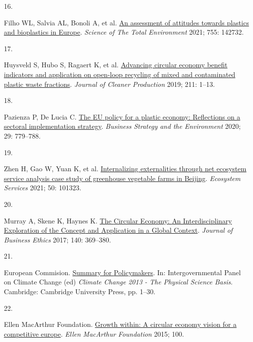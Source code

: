\documentclass[
  12pt,
  a4paperpaper,
  onecolumn]{article}
\newlength{\cslhangindent}
\newlength{\csllabelwidth}
\newlength{\cslentryspacingunit} %
\newenvironment{CSLReferences}[2] %
 {%
  \setlength{\parindent}{0pt}
  \ifodd #1
  \let\oldpar\par
  \def\par{\hangindent=\cslhangindent\oldpar}
  \fi
  \setlength{\parskip}{#2\cslentryspacingunit}
 }%
 {}
\newcommand{\CSLLeftMargin}[1]{\parbox[t]{\csllabelwidth}{#1}}
\newcommand{\CSLRightInline}[1]{\parbox[t]{\linewidth - \csllabelwidth}{#1}\break}
\begin{document}
\begin{CSLReferences}{0}{0}
\leavevmode{}%
\CSLLeftMargin{16. }%
\CSLRightInline{Filho WL, Salvia AL, Bonoli A, et al.
\href{https://doi.org/10.1016/j.scitotenv.2020.142732}{An assessment of
attitudes towards plastics and bioplastics in {Europe}}. \emph{Science
of The Total Environment} 2021; 755: 142732.}

\leavevmode{}%
\CSLLeftMargin{17. }%
\CSLRightInline{Huysveld S, Hubo S, Ragaert K, et al.
\href{https://doi.org/10.1016/j.jclepro.2018.11.110}{Advancing circular
economy benefit indicators and application on open-loop recycling of
mixed and contaminated plastic waste fractions}. \emph{Journal of
Cleaner Production} 2019; 211: 1--13.}

\leavevmode{}%
\CSLLeftMargin{18. }%
\CSLRightInline{Pazienza P, De Lucia C.
\href{https://doi.org/10.1002/bse.2445}{The {EU} policy for a plastic
economy: {Reflections} on a sectoral implementation strategy}.
\emph{Business Strategy and the Environment} 2020; 29: 779--788.}

\leavevmode{}%
\CSLLeftMargin{19. }%
\CSLRightInline{Zhen H, Gao W, Yuan K, et al.
\href{https://doi.org/10.1016/j.ecoser.2021.101323}{Internalizing
externalities through net ecosystem service analysis\textendash{{A}}
case study of greenhouse vegetable farms in {Beijing}}. \emph{Ecosystem
Services} 2021; 50: 101323.}

\leavevmode{}%
\CSLLeftMargin{20. }%
\CSLRightInline{Murray A, Skene K, Haynes K.
\href{https://doi.org/10.1007/s10551-015-2693-2}{The {Circular Economy}:
{An Interdisciplinary Exploration} of the {Concept} and {Application} in
a {Global Context}}. \emph{Journal of Business Ethics} 2017; 140:
369--380.}

\leavevmode{}%
\CSLLeftMargin{21. }%
\CSLRightInline{European Commision.
\href{https://doi.org/10.1017/CBO9781107415324.004}{Summary for
{Policymakers}}. In: Intergovernmental Panel on Climate Change (ed)
\emph{Climate {Change} 2013 - {The Physical Science Basis}}.
{Cambridge}: {Cambridge University Press}, pp. 1--30.}

\leavevmode{}%
\CSLLeftMargin{22. }%
\CSLRightInline{Ellen MacArthur Foundation.
\href{https://doi.org/Article}{Growth within: A circular economy vision
for a competitive europe}. \emph{Ellen MacArthur Foundation} 2015; 100.}


\end{CSLReferences}
\end{document}

